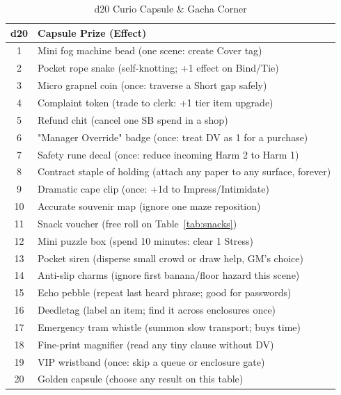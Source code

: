 \begin{table}[h]
\centering
\caption{d20 Curio Capsule \& Gacha Corner}
\label{tab:curio-gacha}
\begin{tabular}{@{}cl@{}}
\toprule
d20 & Capsule Prize (Effect) \\
\midrule
1 & Mini fog machine bead (one scene: create Cover tag) \\
2 & Pocket rope snake (self-knotting; +1 effect on Bind/Tie) \\
3 & Micro grapnel coin (once: traverse a Short gap safely) \\
4 & Complaint token (trade to clerk: +1 tier item upgrade) \\
5 & Refund chit (cancel one SB spend in a shop) \\
6 & "Manager Override" badge (once: treat DV as 1 for a purchase) \\
7 & Safety rune decal (once: reduce incoming Harm 2 to Harm 1) \\
8 & Contract staple of holding (attach any paper to any surface, forever) \\
9 & Dramatic cape clip (once: +1d to Impress/Intimidate) \\
10 & Accurate souvenir map (ignore one maze reposition) \\
11 & Snack voucher (free roll on Table~\ref{tab:snacks}) \\
12 & Mini puzzle box (spend 10 minutes: clear 1 Stress) \\
13 & Pocket siren (disperse small crowd or draw help, GM's choice) \\
14 & Anti-slip charms (ignore first banana/floor hazard this scene) \\
15 & Echo pebble (repeat last heard phrase; good for passwords) \\
16 & Deedletag (label an item; find it across enclosures once) \\
17 & Emergency tram whistle (summon slow transport; buys time) \\
18 & Fine-print magnifier (read any tiny clause without DV) \\
19 & VIP wristband (once: skip a queue or enclosure gate) \\
20 & Golden capsule (choose any result on this table) \\
\bottomrule
\end{tabular}
\end{table}

